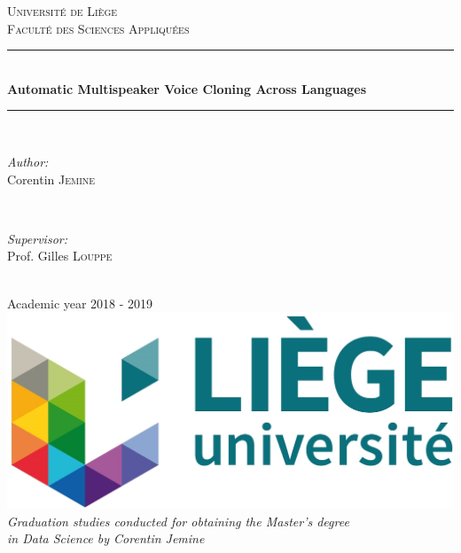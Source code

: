 \documentclass[a4paper, oneside]{article}
\begin{document}
\begin{titlepage}
	\newcommand{\HRule}{\rule{\linewidth}{0.5mm}}
	\center
	\textsc{\LARGE Université de Liège}\\[1cm]
	\textsc{\Large Faculté des Sciences Appliquées}\\[2cm]
		
	\HRule \\[0.5cm]
	{ \huge \bfseries Automatic Multispeaker Voice Cloning Across Languages}\\[0.2cm]
	\HRule \\[3cm]

	\begin{minipage}{0.4\textwidth}
		\begin{flushleft} \Large
			\emph{Author:}\\
			Corentin \textsc{Jemine}
		\end{flushleft}
	\end{minipage}
	~
	\begin{minipage}{0.4\textwidth}
		\begin{flushright} \Large
			\emph{Supervisor:} \\
			Prof. Gilles \textsc{Louppe}
		\end{flushright}
	\end{minipage}\\[4cm]
	
	{\LARGE Academic year 2018 - 2019}\\[2.5cm]
	
	\includegraphics{images/uliege_logo.jpg}\\[1.25cm]
	
	\textit{Graduation studies conducted for obtaining the Master's degree \\in Data Science by Corentin Jemine}
	
	\vfill
\end{titlepage}

\setcounter{page}{2}
\end{document}
